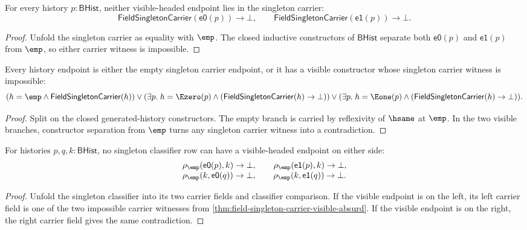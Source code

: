 \begin{theorem}
\label{thm:field-singleton-carrier-visible-absurd}
For every history $p:\mathsf{BHist}$, neither visible-headed endpoint lies in
the singleton carrier:
$$
\mathsf{FieldSingletonCarrier}(\mathsf{e0}(p))\to\bot,
\qquad
\mathsf{FieldSingletonCarrier}(\mathsf{e1}(p))\to\bot.
$$
\end{theorem}
\begin{proof}
Unfold the singleton carrier as equality with $\emp$. The closed inductive
constructors of $\mathsf{BHist}$ separate both $\mathsf{e0}(p)$ and
$\mathsf{e1}(p)$ from $\emp$, so either carrier witness is impossible.
\end{proof}

\begin{theorem}
\label{thm:field-singleton-carrier-empty-or-visible-absurd}
Every history endpoint is either the empty singleton carrier endpoint, or it
has a visible constructor whose singleton carrier witness is impossible:
$$
(h=\emp\land\mathsf{FieldSingletonCarrier}(h))
\lor
(\exists p.\;h=\Ezero(p)\land
(\mathsf{FieldSingletonCarrier}(h)\to\bot))
\lor
(\exists p.\;h=\Eone(p)\land
(\mathsf{FieldSingletonCarrier}(h)\to\bot)).
$$
\end{theorem}
\begin{proof}
Split on the closed generated-history constructors. The empty branch is
carried by reflexivity of $\hsame$ at $\emp$. In the two visible branches,
constructor separation from $\emp$ turns any singleton carrier witness into a
contradiction.
\end{proof}

\begin{theorem}
\label{thm:field-singleton-classifier-visible-endpoint-absurd}
For histories $p,q,k:\mathsf{BHist}$, no singleton classifier row can have a
visible-headed endpoint on either side:
$$
\begin{array}{l}
\rho_{\emp}(\mathsf{e0}(p),k)\to\bot,\qquad
\rho_{\emp}(\mathsf{e1}(p),k)\to\bot,
\\
\rho_{\emp}(k,\mathsf{e0}(q))\to\bot,\qquad
\rho_{\emp}(k,\mathsf{e1}(q))\to\bot.
\end{array}
$$
\end{theorem}
\begin{proof}
Unfold the singleton classifier into its two carrier fields and classifier
comparison. If the visible endpoint is on the left, its left carrier field is
one of the two impossible carrier witnesses from
\autoref{thm:field-singleton-carrier-visible-absurd}. If the visible endpoint
is on the right, the right carrier field gives the same contradiction.
\end{proof}

